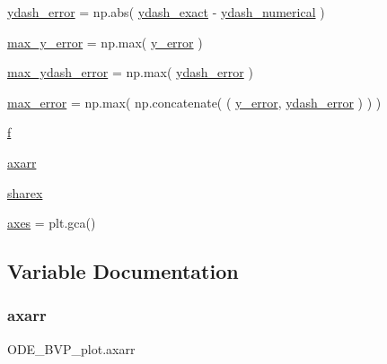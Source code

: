 \begin{DoxyCompactItemize}
\item 
\hyperlink{namespaceODE__BVP__plot_a32b60056578e16000892cd7c6286aa07}{ydash\+\_\+error} = np.\+abs( \hyperlink{namespaceODE__BVP__plot_a391db2f2f7f3511be763c10ed7451340}{ydash\+\_\+exact} -\/ \hyperlink{namespaceODE__BVP__plot_a321cad715aaa19b55082e3163d7cf2ee}{ydash\+\_\+numerical} )
\item 
\hyperlink{namespaceODE__BVP__plot_aa6f0b58debc64720190d4915f760aa5a}{max\+\_\+y\+\_\+error} = np.\+max( \hyperlink{namespaceODE__BVP__plot_a8db68424e12aa3dfa6fd2c118cba6e7c}{y\+\_\+error} )
\item 
\hyperlink{namespaceODE__BVP__plot_ade414a5474caac41479cea546028f37b}{max\+\_\+ydash\+\_\+error} = np.\+max( \hyperlink{namespaceODE__BVP__plot_a32b60056578e16000892cd7c6286aa07}{ydash\+\_\+error} )
\item 
\hyperlink{namespaceODE__BVP__plot_af98eda3ba188f29a21f5f2f124a2e88a}{max\+\_\+error} = np.\+max( np.\+concatenate( ( \hyperlink{namespaceODE__BVP__plot_a8db68424e12aa3dfa6fd2c118cba6e7c}{y\+\_\+error}, \hyperlink{namespaceODE__BVP__plot_a32b60056578e16000892cd7c6286aa07}{ydash\+\_\+error} ) ) )
\item 
\hyperlink{namespaceODE__BVP__plot_a950605ac9efe3d57c5d08a1d684f357b}{f}
\item 
\hyperlink{namespaceODE__BVP__plot_a2227a5a01082d2f53f4867a32fef5d46}{axarr}
\item 
\hyperlink{namespaceODE__BVP__plot_a620ccfcfcbdfd074ab8a58bc1dd78cd2}{sharex}
\item 
\hyperlink{namespaceODE__BVP__plot_ad00bb42d6367c0969af70cd2ab13f464}{axes} = plt.\+gca()
\end{DoxyCompactItemize}


\subsection{Variable Documentation}
\mbox{\label{namespaceODE__BVP__plot_a2227a5a01082d2f53f4867a32fef5d46}} 
\subsubsection{\texorpdfstring{axarr}{axarr}}
{\footnotesize\ttfamily O\+D\+E\+\_\+\+B\+V\+P\+\_\+plot.\+axarr}



